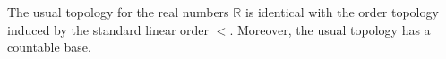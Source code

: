 The usual topology for the real numbers $\mathbb{R}$ is identical with the order topology induced by the standard linear order $<$. Moreover, the usual topology has a countable base.
